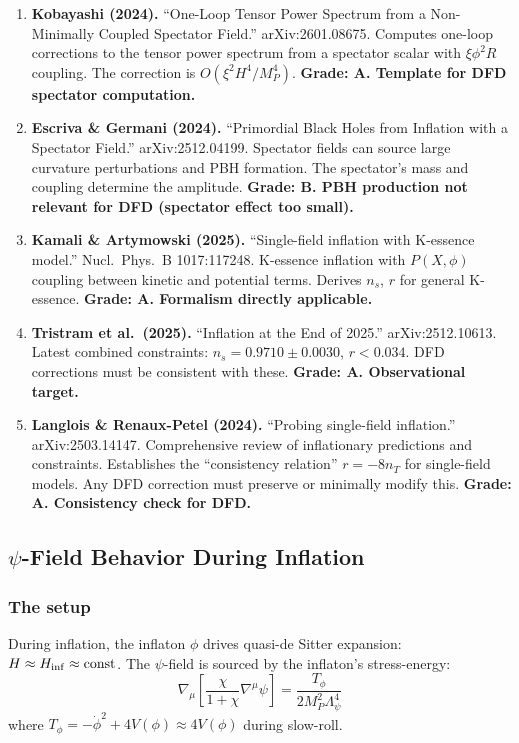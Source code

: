 \documentclass[11pt,a4paper]{article}
\begin{document}
\begin{enumerate}
\item \textbf{Kobayashi (2024).} ``One-Loop Tensor Power Spectrum from a Non-Minimally Coupled Spectator Field.'' arXiv:2601.08675. Computes one-loop corrections to the tensor power spectrum from a spectator scalar with $\xi\phi^2 R$ coupling. The correction is $O(\xi^2 H^4/M_P^4)$. \textbf{Grade: A. Template for DFD spectator computation.}

\item \textbf{Escriva \& Germani (2024).} ``Primordial Black Holes from Inflation with a Spectator Field.'' arXiv:2512.04199. Spectator fields can source large curvature perturbations and PBH formation. The spectator's mass and coupling determine the amplitude. \textbf{Grade: B. PBH production not relevant for DFD (spectator effect too small).}

\item \textbf{Kamali \& Artymowski (2025).} ``Single-field inflation with K-essence model.'' Nucl.\ Phys.\ B 1017:117248. K-essence inflation with $P(X,\phi)$ coupling between kinetic and potential terms. Derives $n_s$, $r$ for general K-essence. \textbf{Grade: A. Formalism directly applicable.}

\item \textbf{Tristram et al.\ (2025).} ``Inflation at the End of 2025.'' arXiv:2512.10613. Latest combined constraints: $n_s = 0.9710 \pm 0.0030$, $r < 0.034$. DFD corrections must be consistent with these. \textbf{Grade: A. Observational target.}

\item \textbf{Langlois \& Renaux-Petel (2024).} ``Probing single-field inflation.'' arXiv:2503.14147. Comprehensive review of inflationary predictions and constraints. Establishes the ``consistency relation'' $r = -8n_T$ for single-field models. Any DFD correction must preserve or minimally modify this. \textbf{Grade: A. Consistency check for DFD.}
\end{enumerate}

\subsection{$\psi$-Field Behavior During Inflation}

\subsubsection{The setup}

During inflation, the inflaton $\phi$ drives quasi-de Sitter expansion: $H \approx H_{\rm inf} \approx \text{const}$. The $\psi$-field is sourced by the inflaton's stress-energy:
\begin{equation}
\nabla_\mu\left[\frac{\chi}{1+\chi}\nabla^\mu\psi\right] = \frac{T_\phi}{2M_P^2\Lambda_\psi^4}
\end{equation}
where $T_\phi = -\dot{\phi}^2 + 4V(\phi) \approx 4V(\phi)$ during slow-roll.
\end{document}
